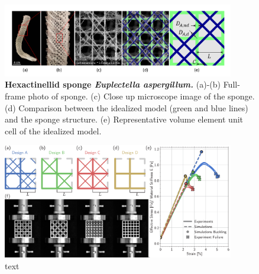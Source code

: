 \documentclass[9pt,twocolumn,twoside]{fernandes_paper}
\begin{document}


\begin{figure}[ht]
  \captionsetup{width=0.8\textwidth}
\begin{center}
\includegraphics[width=0.9\textwidth]{Fig1}
\end{center}
\caption{\textbf{Hexactinellid sponge \textit{Euplectella aspergillum.}} (a)-(b) Full-frame photo of sponge. (c) Close up microscope image of the sponge. (d) Comparison between the idealized model (green and blue lines) and the sponge structure. (e) Representative volume element unit cell of the idealized model.}\label{Fig1}
\end{figure}

\begin{figure}[ht]
	\centering
	\captionsetup{width=0.8\textwidth}
	\includegraphics[width=0.9\textwidth]{Fig2}
	\caption{text}\label{Fig2}
\end{figure}
\end{document}

